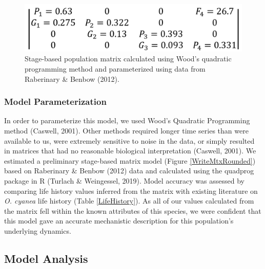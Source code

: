 \documentclass[
  12pt,
]{article}
\begin{document}
\begin{figure}
\includegraphics[width=1\linewidth]{MtxFilled} \caption{Stage-based population matrix calculated using Wood's quadratic programming method and parameterized using data from Raberinary \& Benbow (2012). \label{WriteMtxRounded}}\label{fig:WriteMtxRounded}
\end{figure}

\hypertarget{model-parameterization}{%
\subsubsection{Model Parameterization}\label{model-parameterization}}

In order to parameterize this model, we used Wood's Quadratic Programming method (Caswell, 2001). Other methods required longer time series than were available to us, were extremely sensitive to noise in the data, or simply resulted in matrices that had no reasonable biological interpretation (Caswell, 2001). We estimated a preliminary stage-based matrix model (Figure \ref{WriteMtxRounded}) based on Raberinary \& Benbow (2012) data and calculated using the quadprog package in R (Turlach \& Weingessel, 2019). Model accuracy was assessed by comparing life history values inferred from the matrix with existing literature on \emph{O. cyanea} life history (Table \ref{LifeHistory}). As all of our values calculated from the matrix fell within the known attributes of this species, we were confident that this model gave an accurate mechanistic description for this population's underlying dynamics.

\hypertarget{model-analysis}{%
\subsection{Model Analysis}\label{model-analysis}}
\end{document}
